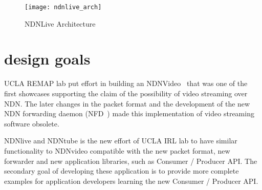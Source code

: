 
\begin{figure*}
  \centering
  \texttt{[image: ndnlive\_arch]}
  \caption{NDNLive Architecture}
  \label{fig:ndnlive_arch}
\end{figure*}

\vspace{0.3cm}
\section{design goals} %
\label{sec:design_goals}
UCLA REMAP lab put effort in building an NDNVideo~\cite{ndnvideo} that was one of the first showcases supporting the claim of the possibility of video streaming over NDN. The later changes in the packet format and the development of the new NDN forwarding daemon (NFD~\cite{nfd-guide}) made this implementation of video streaming software obsolete. 

NDNlive and NDNtube is the new effort of UCLA IRL lab to have similar functionality to NDNvideo compatible with the new packet format, new forwarder and new application libraries, such as Consumer / Producer API. The secondary goal of developing these application is to provide more complete examples for application developers learning the new Consumer / Producer API.


